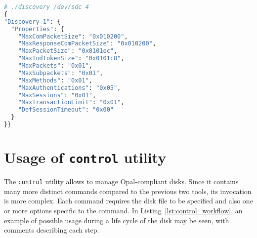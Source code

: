 \begin{lstlisting}[language=python,caption=Execution limited to Level 1 Discovery information,label={lst:discovery_some},commentstyle=\color{black}]
# ./discovery /dev/sdc 4
{
"Discovery 1": {
  "Properties": {
    "MaxComPacketSize": "0x010200",
    "MaxResponseComPacketSize": "0x010200",
    "MaxPacketSize": "0x0101ec",
    "MaxIndTokenSize": "0x0101c8",
    "MaxPackets": "0x01",
    "MaxSubpackets": "0x01",
    "MaxMethods": "0x01",
    "MaxAuthentications": "0x05",
    "MaxSessions": "0x01",
    "MaxTransactionLimit": "0x01",
    "DefSessionTimeout": "0x00"
  }
}}

\end{lstlisting}


\section{Usage of \texttt{control} utility}

The \verb|control| utility allows to manage Opal-compliant disks. Since it contains many more distinct commands compared to the previous two tools, its invocation is more complex. 
Each command requires the disk file to be specified and also one or more options specific to the command. In Listing~\ref{lst:control_workflow}, an example of possible usage during a life cycle of the disk may be seen, with comments describing each step.







